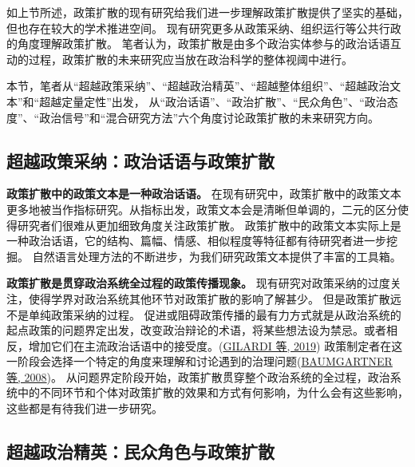\documentclass[
  12pt,
]{ctexart}
\begin{document}
如上节所述，政策扩散的现有研究给我们进一步理解政策扩散提供了坚实的基础，但也存在较大的学术推进空间。
现有研究更多从政策采纳、组织运行等公共行政的角度理解政策扩散。
笔者认为，政策扩散是由多个政治实体参与的政治话语互动的过程，政策扩散的未来研究应当放在政治科学的整体视阈中进行。

本节，笔者从``超越政策采纳''、``超越政治精英''、``超越整体组织''、``超越政治文本''和``超越定量定性''出发，
从``政治话语''、``政治扩散''、``民众角色''、``政治态度''、``政治信号''和``混合研究方法''六个角度讨论政策扩散的未来研究方向。

\hypertarget{ux8d85ux8d8aux653fux7b56ux91c7ux7eb3ux653fux6cbbux8bddux8bedux4e0eux653fux7b56ux6269ux6563}{%
\subsection{超越政策采纳：政治话语与政策扩散}\label{ux8d85ux8d8aux653fux7b56ux91c7ux7eb3ux653fux6cbbux8bddux8bedux4e0eux653fux7b56ux6269ux6563}}

\textbf{政策扩散中的政策文本是一种政治话语。}
在现有研究中，政策扩散中的政策文本更多地被当作指标研究。从指标出发，政策文本会是清晰但单调的，二元的区分使得研究者们很难从更加细致角度关注政策扩散。
政策扩散中的政策文本实际上是一种政治话语，它的结构、篇幅、情感、相似程度等特征都有待研究者进一步挖掘。
自然语言处理方法的不断进步，为我们研究政策文本提供了丰富的工具箱。

\textbf{政策扩散是贯穿政治系统全过程的政策传播现象。}
现有研究对政策采纳的过度关注，使得学界对政治系统其他环节对政策扩散的影响了解甚少。
但是政策扩散远不是单纯政策采纳的过程。
促进或阻碍政策传播的最有力方式就是从政治系统的起点政策的问题界定出发，改变政治辩论的术语，将某些想法设为禁忌。或者相反，增加它们在主流政治话语中的接受度。(\protect\hyperlink{ref-GilardiWasserfallen2019}{GILARDI 等, 2019})
政策制定者在这一阶段会选择一个特定的角度来理解和讨论遇到的治理问题(\protect\hyperlink{ref-BaumgartnerEtAl2008}{BAUMGARTNER 等, 2008})。
从问题界定阶段开始，政策扩散贯穿整个政治系统的全过程，政治系统中的不同环节和个体对政策扩散的效果和方式有何影响，为什么会有这些影响，这些都是有待我们进一步研究。

\hypertarget{ux8d85ux8d8aux653fux6cbbux7cbeux82f1ux6c11ux4f17ux89d2ux8272ux4e0eux653fux7b56ux6269ux6563}{%
\subsection{超越政治精英：民众角色与政策扩散}\label{ux8d85ux8d8aux653fux6cbbux7cbeux82f1ux6c11ux4f17ux89d2ux8272ux4e0eux653fux7b56ux6269ux6563}}
\end{document}
